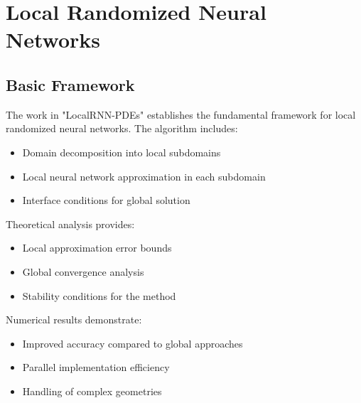 \documentclass[12pt]{article}
\begin{document}
\section{Local Randomized Neural Networks}
\label{sec:local_rnn}

\subsection{Basic Framework}
\label{subsec:local_rnn_basic}
The work in "LocalRNN-PDEs" establishes the fundamental framework for local randomized neural networks. The algorithm includes:
\begin{itemize}
    \item Domain decomposition into local subdomains
    \item Local neural network approximation in each subdomain
    \item Interface conditions for global solution
\end{itemize}
Theoretical analysis provides:
\begin{itemize}
    \item Local approximation error bounds
    \item Global convergence analysis
    \item Stability conditions for the method
\end{itemize}
Numerical results demonstrate:
\begin{itemize}
    \item Improved accuracy compared to global approaches
    \item Parallel implementation efficiency
    \item Handling of complex geometries
\end{itemize}
\end{document}
